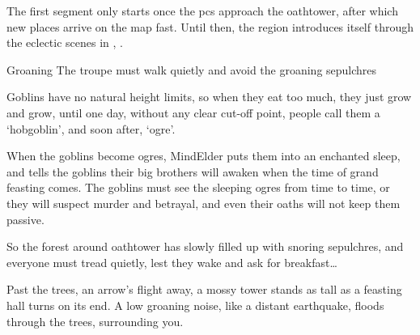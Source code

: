 \begin{multicols}{2}
\noindent
The first \gls{segment} only starts once the \glspl{pc} approach the \gls{oathtower}, after which new places arrive on the map fast.
Until then, the \gls{region} introduces itself through the eclectic scenes in , .


{Groaning }%
{The troupe must walk quietly and avoid the groaning sepulchres}%


\begin{exampletext}
  Goblins have no natural height limits, so when they eat too much, they just grow and grow, until one day, without any clear cut-off point, people call them a `hobgoblin', and soon after, `\gls{ogre}'.

  When the goblins become \glspl{ogre}, \gls{MindElder} puts them into an enchanted sleep, and tells the goblins their big brothers will awaken when the time of grand feasting comes.
  The goblins must see the sleeping \glspl{ogre} from time to time, or they will suspect murder and betrayal, and even their oaths will not keep them passive.

  So the forest around \gls{oathtower} has slowly filled up with snoring sepulchres, and everyone must tread quietly, lest they wake and ask for breakfast\ldots
\end{exampletext}

\begin{boxtext}
  Past the trees, an arrow's flight away, a mossy tower stands as tall as a feasting hall turns on its end.
  A low groaning noise, like a distant earthquake, floods through the trees, surrounding you.
\end{boxtext}


\end{multicols}
